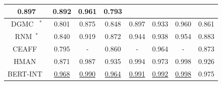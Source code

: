 {\begin{tabular}{@{}cccccccc@{}}
            \multicolumn{1}{c|}{0.897} &
            \multicolumn{1}{c}{0.892} &
            \multicolumn{1}{c|}{0.961} &
            0.793\\
            \midrule
          \multicolumn{1}{c|}{{DGMC~\cite{fey2020deep} $^*$}} &
            \multicolumn{1}{c}{0.801} &
            \multicolumn{1}{c|}{0.875} &
            \multicolumn{1}{c}{0.848} &
            \multicolumn{1}{c|}{0.897} &
            \multicolumn{1}{c}{0.933} &
            \multicolumn{1}{c|}{0.960} &
            0.861\\
            \midrule
           \multicolumn{1}{c|}{RNM~\cite{zhu2020relation}$^*$} &
             \multicolumn{1}{c}{{0.840}} &
             \multicolumn{1}{c|}{{0.919}} &
             \multicolumn{1}{c}{{0.872}} &
             \multicolumn{1}{c|}{{0.944}} &
             \multicolumn{1}{c}{{0.938}} &
             \multicolumn{1}{c|}{{0.954}} &
             0.883\\ \midrule
          \multicolumn{1}{c|}{CEAFF~\cite{CEAFF}} &
            \multicolumn{1}{c}{0.795} &
            \multicolumn{1}{c|}{-} &
            \multicolumn{1}{c}{0.860} &
            \multicolumn{1}{c|}{-} &
            \multicolumn{1}{c}{0.964} &
            \multicolumn{1}{c|}{-} &
            0.873\\ \midrule
          \multicolumn{1}{c|}{HMAN~\cite{yang2019aligning}} &
            \multicolumn{1}{c}{0.871} &
            \multicolumn{1}{c|}{0.987} &
            \multicolumn{1}{c}{0.935} &
            \multicolumn{1}{c|}{0.994} &
            \multicolumn{1}{c}{0.973} &
            \multicolumn{1}{c|}{0.998} &
            0.926\\ 
            \midrule
          \multicolumn{1}{c|}{BERT-INT~\cite{tang2019bert-int}} &
            \multicolumn{1}{c}{\underline{0.968}} &
            \multicolumn{1}{c|}{\underline{0.990}} &
            \multicolumn{1}{c}{\underline{0.964}} &
            \multicolumn{1}{c|}{\underline{0.991}} &
            \multicolumn{1}{c}{\underline{0.992}} &
            \multicolumn{1}{c|}{\underline{0.998}} &
            0.975\\ 
          \midrule

\end{tabular}}
